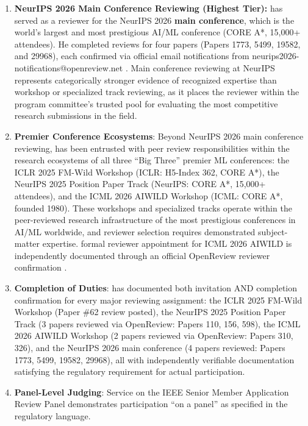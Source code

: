 \begin{enumerate}
    \item \textbf{NeurIPS 2026 Main Conference Reviewing (Highest Tier):} \dr has served as a reviewer for the NeurIPS 2026 \textbf{main conference}, which is the world's largest and most prestigious AI/ML conference (CORE A*, 15,000+ attendees). He completed reviews for four papers (Papers 1773, 5499, 19582, and 29968), each confirmed via official email notifications from neurips2026-notifications@openreview.net \cite{JR39,JR41,JR43,JR45}. Main conference reviewing at NeurIPS represents categorically stronger evidence of recognized expertise than workshop or specialized track reviewing, as it places the reviewer within the program committee's trusted pool for evaluating the most competitive research submissions in the field.

    \item \textbf{Premier Conference Ecosystems}: Beyond NeurIPS 2026 main conference reviewing, \dr has been entrusted with peer review responsibilities within the research ecosystems of all three ``Big Three'' premier ML conferences: the ICLR 2025 FM-Wild Workshop (ICLR: H5-Index 362, CORE A*), the NeurIPS 2025 Position Paper Track (NeurIPS: CORE A*, 15,000+ attendees), and the ICML 2026 AIWILD Workshop (ICML: CORE A*, founded 1980). These workshops and specialized tracks operate within the peer-reviewed research infrastructure of the most prestigious conferences in AI/ML worldwide, and reviewer selection requires demonstrated subject-matter expertise. \drs formal reviewer appointment for ICML 2026 AIWILD is independently documented through an official OpenReview reviewer confirmation \cite{JR37}.

    \item \textbf{Completion of Duties}: \dr has documented both invitation AND completion confirmation for every major reviewing assignment: the ICLR 2025 FM-Wild Workshop (Paper \#62 review posted), the NeurIPS 2025 Position Paper Track (3 papers reviewed via OpenReview: Papers 110, 156, 598), the ICML 2026 AIWILD Workshop (2 papers reviewed via OpenReview: Papers 310, 326), and the NeurIPS 2026 main conference (4 papers reviewed: Papers 1773, 5499, 19582, 29968), all with independently verifiable documentation satisfying the regulatory requirement for actual participation.

    \item \textbf{Panel-Level Judging}: Service on the IEEE Senior Member Application Review Panel demonstrates participation ``on a panel'' as specified in the regulatory language.


\end{enumerate}
